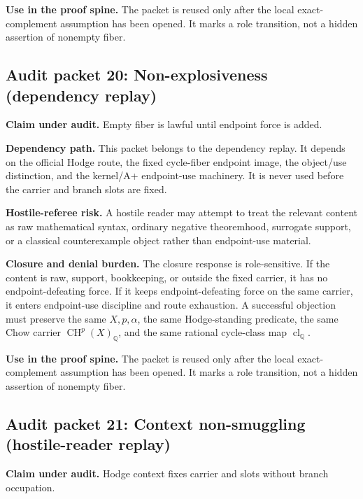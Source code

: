 \documentclass[11pt]{article}
\newcommand{\QQ}{\mathbb{Q}}
\newcommand{\CH}{\operatorname{CH}}
\newcommand{\clQ}{\operatorname{cl}_{\QQ}}
\begin{document}
\par\noindent\textbf{Use in the proof spine.} The packet is reused only after the local exact-complement assumption has been opened. It marks a role transition, not a hidden assertion of nonempty fiber.


\subsection{Audit packet 20: Non-explosiveness (dependency replay)}


\par\noindent\textbf{Claim under audit.} Empty fiber is lawful until endpoint force is added.


\par\noindent\textbf{Dependency path.} This packet belongs to the dependency replay. It depends on the official Hodge route, the fixed cycle-fiber endpoint image, the object/use distinction, and the kernel/A+ endpoint-use machinery. It is never used before the carrier and branch slots are fixed.


\par\noindent\textbf{Hostile-referee risk.} A hostile reader may attempt to treat the relevant content as raw mathematical syntax, ordinary negative theoremhood, surrogate support, or a classical counterexample object rather than endpoint-use material.


\par\noindent\textbf{Closure and denial burden.} The closure response is role-sensitive. If the content is raw, support, bookkeeping, or outside the fixed carrier, it has no endpoint-defeating force. If it keeps endpoint-defeating force on the same carrier, it enters endpoint-use discipline and route exhaustion. A successful objection must preserve the same $X,p,\alpha$, the same Hodge-standing predicate, the same Chow carrier $\CH^p(X)_\QQ$, and the same rational cycle-class map $\clQ$.


\par\noindent\textbf{Use in the proof spine.} The packet is reused only after the local exact-complement assumption has been opened. It marks a role transition, not a hidden assertion of nonempty fiber.


\subsection{Audit packet 21: Context non-smuggling (hostile-reader replay)}


\par\noindent\textbf{Claim under audit.} Hodge context fixes carrier and slots without branch occupation.
\end{document}
